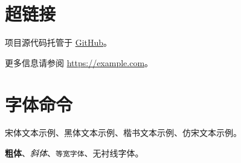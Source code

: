 \section{超链接}

项目源代码托管于 \href{https://github.com/example/project}{GitHub}。

更多信息请参阅 \url{https://example.com}。

\section{字体命令}

{\songti 宋体文本示例}、{\heiti 黑体文本示例}、{\kaishu 楷书文本示例}、{\fangsong 仿宋文本示例}。

\textbf{粗体}、\textit{斜体}、\texttt{等宽字体}、\textsf{无衬线字体}。
